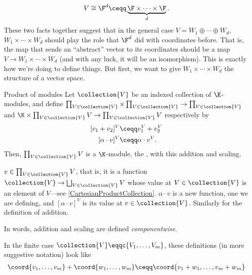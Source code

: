 \begin{equation}
	V\cong \F ^d\ceqq \underbrace{\F \times \cdots \times \F}_d.
\end{equation}
These two facts together suggest that in the general case $V=W_1\oplus \cdots \oplus W_d$, $W_1\times \cdots \times W_d$ should play the role that $\F ^d$ did with coordinates before.  That is, the map that sends an ``abstract'' vector to its coordinates should be a map $V\rightarrow W_1\times \cdots \times W_d$ (and with any luck, it will be an isomorphism).  This is exactly how we're doing to define things.  But first, we want to give $W_1\times \cdots \times W_d$ the structure of a vector space.
\begin{prp}{Product of modules}{}
	Let $\collection{V}$ be an indexed collection of $\K$-modules, and define $\prod _{V\in \collection{V}}\times \prod _{V\in \collection{V}}\rightarrow \prod _{V\in \collection{V}}$ and $\K \times \prod _{V\in \collection{V}}V\rightarrow \prod _{V\in \collection{V}}V$ respectively by
	\begin{subequations}
		\begin{align}
			[v_1+v_2]^V & \ceqq v_1^V+v_2^V \\
			[\alpha \cdot v]^V & \ceqq \alpha \cdot v^V.
		\end{align}
	\end{subequations}
	Then, $\prod _{V\in \collection{V}}V$ is a $\K$-module, the , with this addition and scaling.
	\begin{rmk}
		$v\in \prod _{V\in \collection{V}}V$, that is, it is a function $\collection{V}\rightarrow \bigsqcup _{V\in \collection{V}}V$ whose value at $V\in \collection{V}$ is an element of $V$---see \cref{CartesianProductCollection}.  $\alpha \cdot v$ is a new function, one we are defining, and $[\alpha \cdot v]^V$ is its value at $v\in \collection{V}$.  Similarly for the definition of addition.
	\end{rmk}
	\begin{rmk}
		In words, addition and scaling are defined \emph{componentwise}.
	\end{rmk}
	\begin{rmk}
		In the finite case $\collection{V}\eqqc \{ V_1,\ldots ,V_m\}$, these definitions (in more suggestive notation) look like
		\begin{subequations}
			\begin{align}
				\coord{v_1,\ldots ,v_m}+\coord{w_1,\ldots ,w_m} & \ceqq \coord{v_1+w_1,\ldots ,v_m+w_m} \\

\end{align}
\end{subequations}
\end{rmk}
\end{prp}
